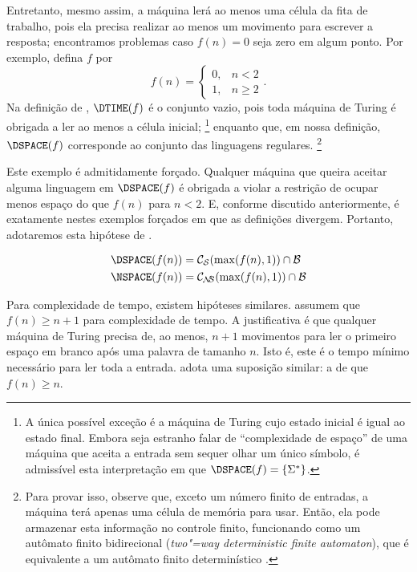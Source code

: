 Entretanto,
mesmo assim,
a máquina lerá ao menos uma célula da fita de trabalho,
pois ela precisa realizar ao menos um movimento para escrever a resposta;
encontramos problemas caso $f(n) = 0$ seja zero em algum ponto.
Por exemplo, defina $f$ por
\begin{equation*}
    f(n) = \begin{cases}
        0, & n < 2 \\
        1, & n \geq 2
    \end{cases}.
\end{equation*}
Na definição de ,
$\DTIME(f)$ é o conjunto vazio,
pois toda máquina de Turing
é obrigada a ler ao menos a célula inicial;%
\footnote{
    A única possível exceção
    é a máquina de Turing
    cujo estado inicial é igual ao estado final.
    Embora seja estranho falar de ``complexidade de espaço''
    de uma máquina que aceita a entrada sem sequer olhar um único símbolo,
    é admissível esta interpretação em que
    $\DSPACE(f) = \{\Sigma^*\}$.
}
enquanto que, em nossa definição,
$\DSPACE(f)$ corresponde ao conjunto das linguagens regulares.%
\footnote{
    Para provar isso, observe que,
    exceto um número finito de entradas,
    a máquina terá apenas uma célula de memória para usar.
    Então, ela pode armazenar esta informação no controle finito,
    funcionando como um autômato finito bidirecional
    (\emph{two"=way deterministic finite automaton}),
    que é equivalente a um autômato finito determinístico
    \cite[p.~40]{HopcroftUllman1979}.
}

Este exemplo é admitidamente forçado.
Qualquer máquina que queira aceitar alguma linguagem em $\DSPACE(f)$
é obrigada a violar a restrição de
ocupar menos espaço do que $f(n)$
para $n < 2$.
E, conforme discutido anteriormente,
é exatamente nestes exemplos forçados
em que as definições divergem.
Portanto, adotaremos esta hipótese de
.

\begin{definition}
    \begin{align*}
        \DSPACE(f(n)) &= \mathcal C_\PhiDS(\max(f(n), 1)) \cap \mathcal B \\
        \NSPACE(f(n)) &= \mathcal C_\PhiNS(\max(f(n), 1)) \cap \mathcal B
    \end{align*}
\end{definition}

Para complexidade de tempo,
existem hipóteses similares.
assumem que $f(n) \geq n+1$
para complexidade de tempo.
A justificativa é que
qualquer máquina de Turing precisa de,
ao menos,
$n+1$ movimentos para ler o primeiro espaço em branco
após uma palavra de tamanho $n$.
Isto é,
este é o tempo mínimo necessário
para ler toda a entrada.
adota uma suposição similar:
a de que $f(n) \geq n$.

